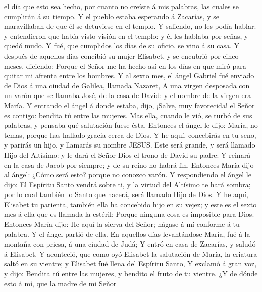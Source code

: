 el día que esto sea hecho, por cuanto no creíste á mis palabras, las
cuales se cumplirán á su tiempo.  Y el pueblo estaba
esperando á Zacarías, y se maravillaban de que él se detuviese en el
templo.  Y saliendo, no les podía hablar: y entendieron que
había visto visión en el templo: y él les hablaba por señas, y quedó
mudo.  Y fué, que cumplidos los días de su oficio, se vino
á su casa.  Y después de aquellos días concibió su mujer
Elisabet, y se encubrió por cinco meses, diciendo:  Porque
el Señor me ha hecho así en los días en que miró para quitar mi afrenta
entre los hombres.  Y al sexto mes, el ángel Gabriel fué
enviado de Dios á una ciudad de Galilea, llamada Nazaret, 
A una virgen desposada con un varón que se llamaba José, de la casa de
David: y el nombre de la virgen era María.  Y entrando el
ángel á donde estaba, dijo, ¡Salve, muy favorecida! el Señor es contigo:
bendita tú entre las mujeres.  Mas ella, cuando le vió, se
turbó de sus palabras, y pensaba qué salutación fuese ésta.
 Entonces el ángel le dijo: María, no temas, porque has
hallado gracia cerca de Dios.  Y he aquí, concebirás en tu
seno, y parirás un hijo, y llamarás su nombre JESUS.  Este
será grande, y será llamado Hijo del Altísimo: y le dará el Señor Dios
el trono de David su padre:  Y reinará en la casa de Jacob
por siempre; y de su reino no habrá fin.  Entonces María
dijo al ángel: ¿Cómo será esto? porque no conozco varón.  Y
respondiendo el ángel le dijo: El Espíritu Santo vendrá sobre ti, y la
virtud del Altísimo te hará sombra; por lo cual también lo Santo que
nacerá, será llamado Hijo de Dios.  Y he aquí, Elisabet tu
parienta, también ella ha concebido hijo en su vejez; y este es el sexto
mes á ella que es llamada la estéril:  Porque ninguna cosa
es imposible para Dios.  Entonces María dijo: He aquí la
sierva del Señor; hágase á mí conforme á tu palabra. Y el ángel partió
de ella.  En aquellos días levantándose María, fué á la
montaña con priesa, á una ciudad de Judá;  Y entró en casa
de Zacarías, y saludó á Elisabet.  Y aconteció, que como
oyó Elisabet la salutación de María, la criatura saltó en su vientre; y
Elisabet fué llena del Espíritu Santo,  Y exclamó á gran
voz, y dijo: Bendita tú entre las mujeres, y bendito el fruto de tu
vientre.  ¿Y de dónde esto á mí, que la madre de mi Señor
